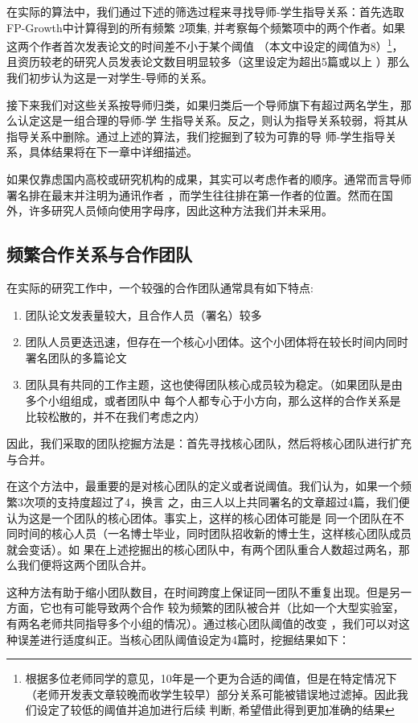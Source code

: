 \documentclass[a4paper]{article}
\begin{document}
在实际的算法中，我们通过下述的筛选过程来寻找导师-学生指导关系：首先选取FP-Growth中计算得到的所有频繁
2项集, 并考察每个频繁项中的两个作者。如果这两个作者首次发表论文的时间差不小于某个阈值
（本文中设定的阈值为8）\footnote{根据多位老师同学的意见，10年是一个更为合适的阈值，但是在特定情况下
（老师开发表文章较晚而收学生较早）部分关系可能被错误地过滤掉。因此我们设定了较低的阈值并追加进行后续
判断, 希望借此得到更加准确的结果}，且资历较老的研究人员发表论文数目明显较多（这里设定为超出5篇或以上
）那么我们初步认为这是一对学生-导师的关系。

接下来我们对这些关系按导师归类，如果归类后一个导师旗下有超过两名学生，那么认定这是一组合理的导师-学
生指导关系。反之，则认为指导关系较弱，将其从指导关系中删除。通过上述的算法，我们挖掘到了较为可靠的导
师-学生指导关系，具体结果将在下一章中详细描述。

如果仅靠虑国内高校或研究机构的成果，其实可以考虑作者的顺序。通常而言导师署名排在最末并注明为通讯作者
，而学生往往排在第一作者的位置。然而在国外，许多研究人员倾向使用字母序，因此这种方法我们并未采用。

\subsection{频繁合作关系与合作团队}
在实际的研究工作中，一个较强的合作团队通常具有如下特点:
\begin{enumerate}
  \item 团队论文发表量较大，且合作人员（署名）较多
  \item 团队人员更迭迅速，但存在一个核心小团体。这个小团体将在较长时间内同时署名团队的多篇论文
  \item 团队具有共同的工作主题，这也使得团队核心成员较为稳定。（如果团队是由多个小组组成，或者团队中
    每个人都专心于小方向，那么这样的合作关系是比较松散的，并不在我们考虑之内）
\end{enumerate}
因此，我们采取的团队挖掘方法是：首先寻找核心团队，然后将核心团队进行扩充与合并。

在这个方法中，最重要的是对核心团队的定义或者说阈值。我们认为，如果一个频繁3次项的支持度超过了4，换言
之，由三人以上共同署名的文章超过4篇，我们便认为这是一个团队的核心团体。事实上，这样的核心团体可能是
同一个团队在不同时间的核心人员（一名博士毕业，同时团队招收新的博士生，这样核心团队成员就会变话）。如
果在上述挖掘出的核心团队中，有两个团队重合人数超过两名，那么我们便将这两个团队合并。

这种方法有助于缩小团队数目，在时间跨度上保证同一团队不重复出现。但是另一方面，它也有可能导致两个合作
较为频繁的团队被合并（比如一个大型实验室，有两名老师共同指导多个小组的情况）。通过核心团队阈值的改变
，我们可以对这种误差进行适度纠正。当核心团队阈值设定为4篇时，挖掘结果如下：
\end{document}
